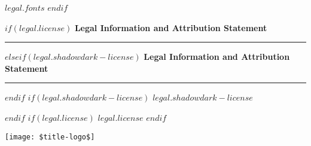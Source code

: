 {  \scriptsize
  $legal.fonts$
  $endif$

  $if(legal.license)$
  \footnotesize\textbf{Legal Information and Attribution Statement}
  \vspace{3pt}
  \hrule
  \vspace{-3pt}
  
  \scriptsize
  $elseif(legal.shadowdark-license)$
  \footnotesize\textbf{Legal Information and Attribution Statement}
  \vspace{3pt}
  \hrule
  \vspace{-3pt}
  
  \scriptsize
  $endif$
  $if(legal.shadowdark-license)$
  $legal.shadowdark-license$
  
  $endif$
  $if(legal.license)$
  $legal.license$
  $endif$

  \begin{center}
  \vfill
  \texttt{[image: \$title-logo\$]}
  \end{center}
  \clearpage
  \restoregeometry
  \normalsize
}

\newcommand{\shadowdarkTitlePageAsCover}{%
  \clearpage
  \thispagestyle{empty}
  \begin{center}
  \vspace*{$title-top-spacing$}
  \color{black}%
  \fontsize{46}{30}\selectfont\displayfont{$title$}

  \vspace{-6mm}
  \texttt{[image: \$title-line\$]}
  
  \vspace{-5mm}
  $if(subtitle)$
  \sffamily\normalsize\bfseries{$subtitle$}
  $endif$

  $if(subtitle)$
  \vspace{-4mm}
  $else$
  \vspace{-2mm}
  $endif$
  
  $if(author)$
  \sffamily\LARGE\bfseries{$author$}
  $else$
  \vspace{4mm}
  $endif$

  \texttt{[image: \$title-deco\$]}

  \vfill
  \texttt{[image: \$title-logo\$]}
  \end{center}

  \clearpage
  \normalsize
}

\newcommand{\makecoverback}{%
  \clearpage
  \addtocounter{page}{-1}
  \thispagestyle{empty}
  \begin{center}
    $if(upper-cover-back)$
      \small{$upper-cover-back$}
    $endif$
    $if(lower-cover-back)$
      \phantom{Copyright}
      \vfill
      \small{$lower-cover-back$}
    $endif$
  \end{center}
}

